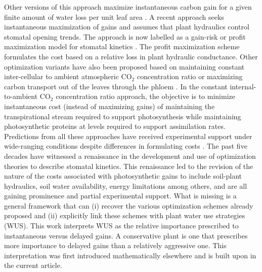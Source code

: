 \documentclass[utf8]{frontiersSCNS} %
\begin{document}
Other versions of this approach maximize instantaneous carbon gain for a given finite amount of water loss per unit leaf area \citep{katul_leaf_2009}.  A recent approach seeks instantaneous maximization of gains and assumes that plant hydraulics control stomatal opening trends.  The approach is now labelled as a gain-risk or profit maximization model for stomatal kinetics \citep{sperry_pragmatic_2016,sperry_predicting_2017}. The profit maximization scheme formulates the cost based on a relative loss in plant hydraulic conductance.  Other optimization variants have also been proposed based on maintaining constant inter-cellular to ambient atmospheric CO$_2$ concentration ratio \citep{prentice2014balancing} or maximizing carbon transport out of the leaves through the phloem \citep{nikinmaa_assimilate_2013}.  In the constant internal-to-ambient CO$_2$ concentration ratio approach, the objective is to minimize instantaneous cost (instead of maximizing gains) of maintaining the transpirational stream required to support photosynthesis while maintaining photosynthetic proteins at levels required to support assimilation rates.  Predictions from all these approaches have received experimental support under wide-ranging conditions despite differences in formulating costs  \citep{nikinmaa_assimilate_2013,prentice2014balancing,sperry_predicting_2017}.
The past five decades have witnessed a renaissance in the development and use of optimization theories to describe stomatal kinetics. This renaissance led to the revision of the nature of the costs associated with photosynthetic gains to include soil-plant hydraulics, soil water availability, energy limitations \citep{roth2018fossil} among others, and are all gaining prominence and partial experimental support. What is missing is a general framework that can (i) recover the various optimization schemes already proposed and (ii) explicitly link these schemes with plant water use strategies (WUS). This work interprets WUS as the relative importance prescribed to instantaneous versus delayed gains. A conservative plant is one that prescribes more importance to delayed gains than a relatively aggressive one. This interpretation was first introduced mathematically elsewhere \citep{manzoni_optimization_2013} and is built upon in the current article.
\end{document}
